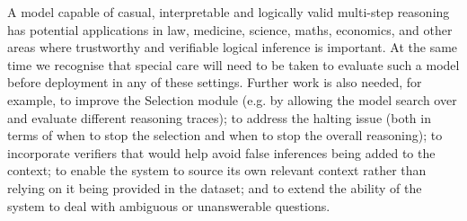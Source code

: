 A model capable of casual, interpretable and logically valid multi-step reasoning has potential applications in law, medicine, science, maths, economics, and other areas where trustworthy and verifiable logical inference is important. At the same time we recognise that special care will need to be taken to evaluate such a model before deployment in any of these settings. Further work is also needed, for example, to improve the Selection module (e.g. by allowing the model search over and evaluate different reasoning traces); to address the halting issue (both in terms of when to stop the selection and when to stop the overall reasoning); to incorporate verifiers that would help avoid false inferences being added to the context; to enable the system to source its own relevant context rather than relying on it being provided in the dataset; and to extend the ability of the system to deal with ambiguous or unanswerable questions.


